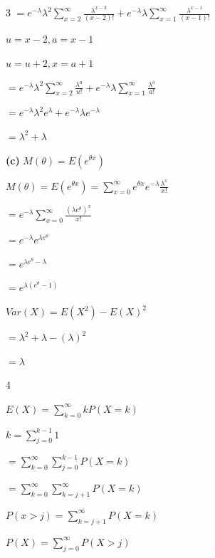 \documentclass[12 pt]{article}
\begin{document}
\begin{exercise}{3}
    $= e^{- \lambda} \lambda^2 \sum_{x = 2}^{\infty} \frac{\lambda^{x - 2}}{(x - 2)!} + e^{- \lambda} \lambda \sum_{x = 1}^{\infty} \frac{\lambda^{x-1}}{(x - 1)!}$

    \hfill

    $u = x-2, a = x-1$
    
    $u = u+2, x = a+1$

    \hfill

    $= e^{- \lambda} \lambda^2 \sum_{x = 2}^{\infty} \frac{\lambda^{u}}{u!} + e^{- \lambda} \lambda \sum_{x = 1}^{\infty} \frac{\lambda^{a}}{a!}$

    $= e^{- \lambda} {\lambda}^2 e^{\lambda} + e^{-\lambda} {\lambda} e^{-\lambda}$

    $= {\lambda}^2 + {\lambda}$

    \hfill

    \textbf{(c)} $M(\theta) = E(e^{\theta x})$

    $M(\theta) = E(e^{\theta x}) = \sum_{x = 0}^{\infty} e^{\theta x} e^{-\lambda} \frac{{\lambda}^x}{x!}$

    $= e^{-\lambda} \sum_{x = 0}^{\infty} \frac{({\lambda e^{\theta}})^x}{x!}$

    $= e^{- \lambda} e^{\lambda e^\theta}$

    $= e^{\lambda e^{\theta} - \lambda}$

    $= e^{\lambda(e^{\theta}-1)}$

    \hfill

    $Var(X) = E(X^2) - E(X)^2$

    $= {\lambda}^2 + {\lambda} - ({\lambda})^2$

    $= {\lambda}$

    \hfill
    \end{exercise}



    \begin{exercise}{4}
    \hfill

    $E(X) = \sum_{k = 0}^{\infty} k P(X=k)$

    \hfill

    $k = \sum_{j = 0}^{k-1} 1$

    \hfill

    $ = \sum_{k = 0}^{\infty} \sum_{j=0}^{k-1} P(X=k)$

    $ = \sum_{k = 0}^{\infty} \sum_{k = j + 1}^{\infty} P(X=k)$

    \hfill

    $P(x > j) = \sum_{k=j+1}^{\infty} P(X=k)$

    $P(X) = \sum_{j=0}^{\infty} P(X>j)$

    \hfill
    \end{exercise}
\end{document}
